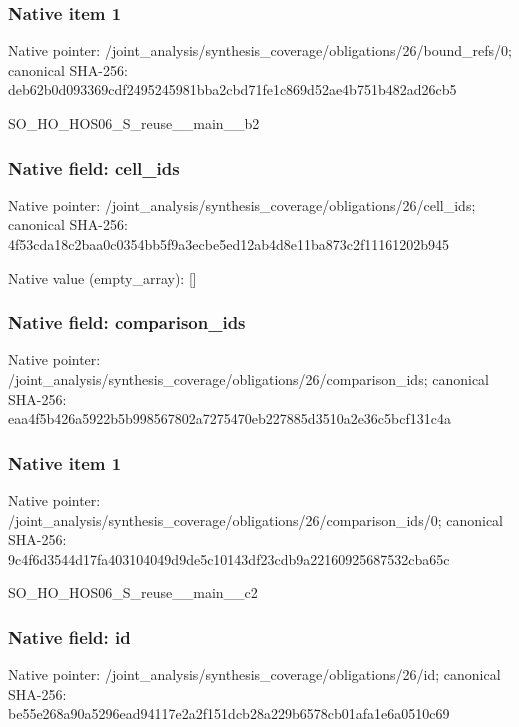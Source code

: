\documentclass[10pt,a4paper]{article}
\begin{document}
\subsubsection{Native item 1}
Native pointer: /joint\_\allowbreak{}analysis/synthesis\_\allowbreak{}coverage/obligations/26/bound\_\allowbreak{}refs/0; canonical SHA-256: deb62b0d093369cdf2495245981bba2cbd71fe1c869d52ae4b751b482ad26cb5

\begingroup\raggedright\sloppy SO\_\allowbreak{}HO\_\allowbreak{}HOS06\_\allowbreak{}S\_\allowbreak{}reuse\_\allowbreak{}\_\allowbreak{}main\_\allowbreak{}\_\allowbreak{}b2\par\endgroup

\subsubsection{Native field: cell\_\allowbreak{}ids}
Native pointer: /joint\_\allowbreak{}analysis/synthesis\_\allowbreak{}coverage/obligations/26/cell\_\allowbreak{}ids; canonical SHA-256: 4f53cda18c2baa0c0354bb5f9a3ecbe5ed12ab4d8e11ba873c2f11161202b945

Native value (empty\_\allowbreak{}array): []

\subsubsection{Native field: comparison\_\allowbreak{}ids}
Native pointer: /joint\_\allowbreak{}analysis/synthesis\_\allowbreak{}coverage/obligations/26/comparison\_\allowbreak{}ids; canonical SHA-256: eaa4f5b426a5922b5b998567802a7275470eb227885d3510a2e36c5bcf131c4a

\subsubsection{Native item 1}
Native pointer: /joint\_\allowbreak{}analysis/synthesis\_\allowbreak{}coverage/obligations/26/comparison\_\allowbreak{}ids/0; canonical SHA-256: 9c4f6d3544d17fa403104049d9de5c10143df23cdb9a22160925687532cba65c

\begingroup\raggedright\sloppy SO\_\allowbreak{}HO\_\allowbreak{}HOS06\_\allowbreak{}S\_\allowbreak{}reuse\_\allowbreak{}\_\allowbreak{}main\_\allowbreak{}\_\allowbreak{}c2\par\endgroup

\subsubsection{Native field: id}
Native pointer: /joint\_\allowbreak{}analysis/synthesis\_\allowbreak{}coverage/obligations/26/id; canonical SHA-256: be55e268a90a5296ead94117e2a2f151dcb28a229b6578cb01afa1e6a0510c69
\end{document}
